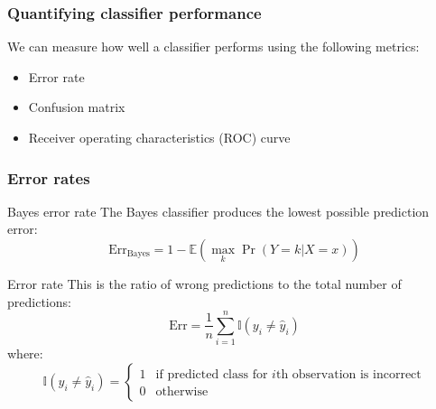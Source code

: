 \documentclass[smaller]{beamer}
\newcommand{\lt}{\left}
\newcommand{\rt}{\right}
\newcommand{\?}{\stackrel{?}{=}}
\newcommand{\fr}{\frac}
\newcommand{\Err}{\text{Err}}
\begin{document}
\begin{frame}
  \frametitle{Quantifying classifier performance}
  \pause
  We can measure how well a classifier performs using the following metrics:\pause
  \begin{itemize}[<+->]
  \item Error rate
  \item Confusion matrix
  \item Receiver operating characteristics (ROC) curve
  \end{itemize}
\end{frame}
\begin{frame}
  \frametitle{Error rates}
  \pause
  \begin{block}{Bayes error rate}\pause
    The Bayes classifier produces the lowest possible prediction error: \pause
    \begin{equation}
     \Err_{\text{Bayes}} = 1 - \mathbb{E}\lt(\max_k \Pr(Y=k|X=x)\rt)
  \end{equation}
\end{block}

  \pause
  \begin{block}{ Error rate}\pause
    This is the ratio of wrong predictions to the total number of predictions:\pause
  \begin{equation}
   \Err =  \fr1n \sum_{i=1}^n \mathbb{I}(y_i \ne \hat y_i)
 \end{equation}\pause
 where:
 \begin{equation}
   \mathbb{I}(y_i \ne \hat y_i) =
   \begin{cases}
     1 & \text{if predicted class for $i$th observation is incorrect} \\
     0 & \text{otherwise}
   \end{cases}
 \end{equation}
\end{block}
\end{frame}
\end{document}
